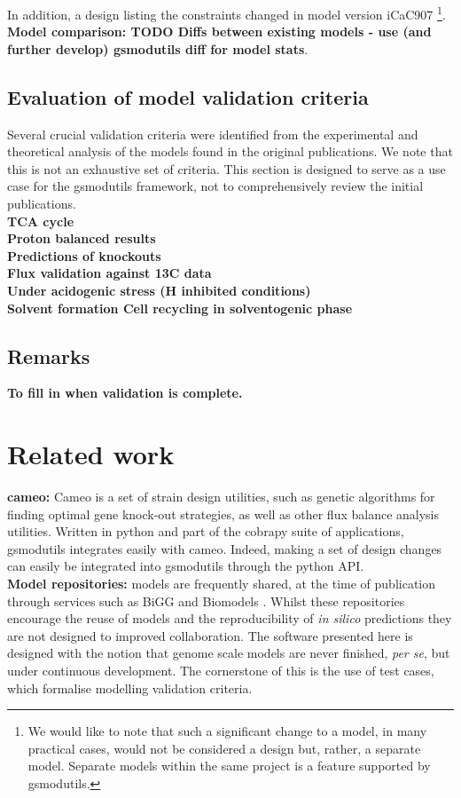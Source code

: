 \documentclass[a4paper,10pt]{article}
\begin{document}
In addition, a design listing the constraints changed in model version iCaC907 
\footnote{We would like to note that such a significant change to a model, in many practical cases, would not be considered a design but, rather, a separate model.
Separate models within the same project is a feature supported by gsmodutils.}.
\\
\textbf{Model comparison: TODO Diffs between existing models - use (and further develop) gsmodutils diff for model stats}.

\subsection{Evaluation of model validation criteria}
Several crucial validation criteria were identified from the experimental and theoretical analysis of the models found in the original publications.
We note that this is not an exhaustive set of criteria.
This section is designed to serve as a use case for the gsmodutils framework, not to comprehensively review the initial publications.
\\
\textbf{TCA cycle}\\
\textbf{Proton balanced results}\\
\textbf{Predictions of knockouts}\\
\textbf{Flux validation against 13C data}\\
\textbf{Under acidogenic stress (H inhibited conditions) } \\
\textbf{Solvent formation Cell recycling in solventogenic phase}\\


\subsection{Remarks} 
\textbf{To fill in when validation is complete.}

\section{Related work}
\textbf{cameo:} Cameo \cite{cardoso2017cameo} is a set of strain design utilities, such as genetic algorithms for finding optimal gene knock-out
strategies, as well as other flux balance analysis utilities. Written in python and part of the cobrapy suite of applications,
gsmodutils integrates easily with cameo.
Indeed, making a set of design changes can easily be integrated into gsmodutils through the python API.
\\
\textbf{Model repositories:} models are frequently shared, at the time of publication through services such as BiGG \cite{king2015bigg} and Biomodels \cite{chelliah2013biomodels}. 
Whilst these repositories encourage the reuse of models and the reproducibility of \textit{in silico} predictions they are not designed to improved collaboration.
The software presented here is designed with the notion that genome scale models are never finished, \textit{per se}, but under continuous development.
The cornerstone of this is the use of test cases, which formalise modelling validation criteria.
\end{document}
